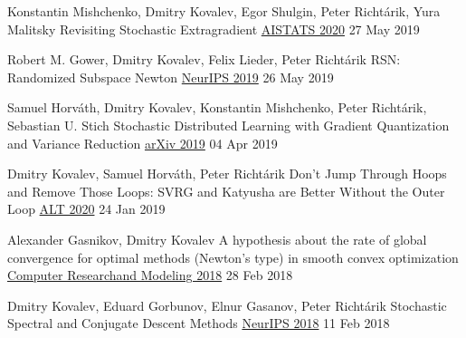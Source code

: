 \begin{cventries}
\cventry
{Konstantin Mishchenko, Dmitry Kovalev, Egor Shulgin, Peter Richtárik, Yura Malitsky} %
{Revisiting Stochastic Extragradient} %
{\href{http://proceedings.mlr.press/v108/mishchenko20a}{AISTATS 2020}} 
{27 May 2019} %
{}	

\cventry
{Robert M. Gower, Dmitry Kovalev, Felix Lieder, Peter Richtárik} %
{RSN: Randomized Subspace Newton} %
{\href{https://papers.nips.cc/paper/8351-rsn-randomized-subspace-newton}{NeurIPS 2019}} 
{26 May 2019} %
{}	


\cventry
{Samuel Horváth, Dmitry Kovalev, Konstantin Mishchenko, Peter Richtárik, Sebastian U. Stich} %
{Stochastic Distributed Learning with Gradient Quantization and Variance Reduction} %
{\href{https://arxiv.org/abs/1904.05115}{arXiv 2019}} 
{04 Apr 2019} %
{}	

\cventry
{Dmitry Kovalev, Samuel Horváth, Peter Richtárik} %
{Don't Jump Through Hoops and Remove Those Loops: SVRG and Katyusha are Better Without the Outer Loop} %
{\href{http://proceedings.mlr.press/v117/kovalev20a}{ALT 2020}} 
{24 Jan 2019} %
{}	

\cventry
{Alexander Gasnikov, Dmitry Kovalev} %
{A hypothesis about the rate of global convergence for optimal methods (Newton's type) in smooth convex optimization} %
{\href{http://www.mathnet.ru/php/archive.phtml?wshow=paper\&jrnid=crm\&paperid=253\&option\_lang=eng}{
						Computer Research\linebreak and Modeling  2018}} 
{28 Feb 2018} %
{}	

\cventry
{Dmitry Kovalev, Eduard Gorbunov, Elnur Gasanov, Peter Richtárik} %
{Stochastic Spectral and Conjugate Descent Methods} %
{\href{https://papers.nips.cc/paper/7596-stochastic-spectral-and-conjugate-descent-methods}{NeurIPS 2018}} 
{11 Feb 2018} %
{}	


\end{cventries}

